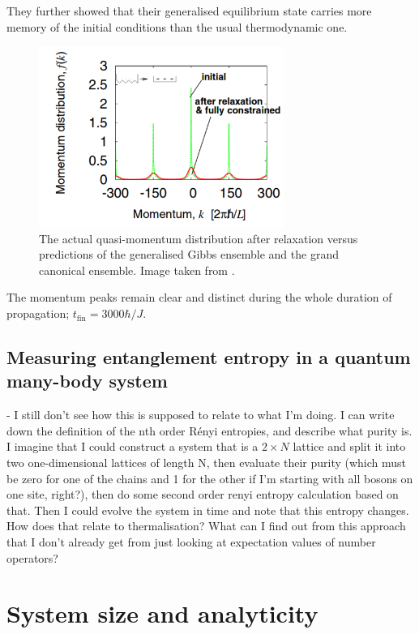 \documentclass[a4paper, 10pt]{article}
\theoremstyle{plain}
\begin{document}
They further showed that their generalised equilibrium state carries more memory
of the initial conditions than the usual thermodynamic one.
\begin{figure}[H]
    \begin{center}
        \includegraphics[width=8cm]{after_relaxation_rigol}
    \end{center}
    \caption{The actual quasi-momentum distribution after relaxation versus
             predictions of the generalised Gibbs ensemble and the grand
             canonical ensemble. Image taken from \cite{Rigol2007}.}
 \end{figure}

The momentum peaks remain clear and distinct during the whole duration  of
propagation; $t_{\text{fin}} = 3000 \hbar/J$.

\subsection{Measuring entanglement entropy in a quantum many-body system}

- I still don't see how this is supposed to relate to what I'm doing.
I can write down the definition of the nth order R\'enyi entropies, and
describe what purity is. I imagine that I could construct a system that is a
$2 \times N$ lattice and split it into two one-dimensional lattices of length N,
then evaluate their purity (which must be zero for one of the chains and 1 for
the other if I'm starting with all bosons on one site, right?), then do some
second order renyi entropy calculation based on that. Then I could evolve the
system in time and note that this entropy changes. How does that relate to
thermalisation? What can I find out from this approach that I don't already
get from just looking at expectation values of number operators?

\newpage

\section{System size and analyticity}
\end{document}
